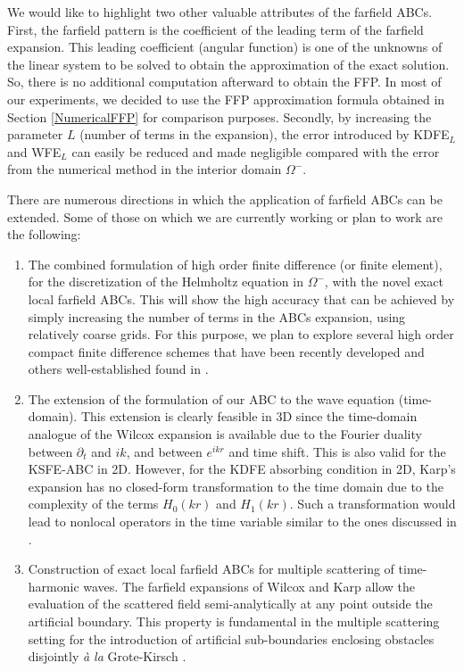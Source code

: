 \documentclass[final,3p,times,12pt]{elsarticle}
\begin{document}
We would like to highlight two other valuable attributes of the farfield ABCs. First, the farfield pattern is the coefficient of the leading term of the farfield expansion. This leading coefficient (angular function) is 
one of the unknowns of the linear system to be solved to obtain the approximation of the exact solution. So, there is no additional computation afterward to obtain the FFP.  In most of our experiments, we decided to use the FFP approximation formula obtained in Section \ref{NumericalFFP} for comparison purposes.
Secondly, by increasing the parameter $L$ (number of terms in the expansion), the error introduced by KDFE$_L$ and WFE$_L$ can easily be reduced and made negligible compared with the error from the numerical method in the interior domain $\Omega^{-}$. 

There are numerous directions in which the application of farfield ABCs can be extended. Some  of those on which we are currently working or plan to work are the following:
\begin{enumerate}
\item  {The combined formulation of high order finite difference (or finite element), for the discretization of the Helmholtz equation in $\Omega^{-}$, with the novel exact local farfield ABCs. This will show the high accuracy that can be achieved by simply increasing the number of terms in the ABCs expansion, using relatively coarse grids. For this purpose, we plan to explore several high order compact finite difference schemes that have been recently developed  \cite{Britt-Tsynkov-Turkel2010,Turkel-Gordon2013} and others well-established found in \cite{Lele1992}.}

\item  The extension of the formulation of our ABC to the wave equation (time-domain). This extension is clearly feasible in 3D since the time-domain analogue of the Wilcox expansion is available \cite{Bayliss-TurkelWave1980,Grote03} due to the Fourier duality between $\partial_{t}$ and $ik$, and between $e^{ikr}$ and time shift. This is also valid for the KSFE-ABC in 2D. However, for the KDFE absorbing condition in 2D, Karp's expansion has no closed-form transformation to the time domain due to the complexity of the terms $H_{0}(kr)$ and $H_{1}(kr)$. Such a transformation would lead to nonlocal operators in the time variable similar to the ones discussed in \cite{Alpert-Greengard-Hagstrom2000}.   

\item Construction of exact local farfield ABCs for multiple scattering of time-harmonic waves. The farfield expansions of Wilcox and Karp allow the evaluation of the scattered field semi-analytically at any point outside the artificial boundary. This property is fundamental in the multiple scattering setting for the introduction of artificial sub-boundaries enclosing obstacles disjointly \textit{\`{a} la} Grote-Kirsch \cite{Grote01}.

\end{enumerate}
\end{document}
